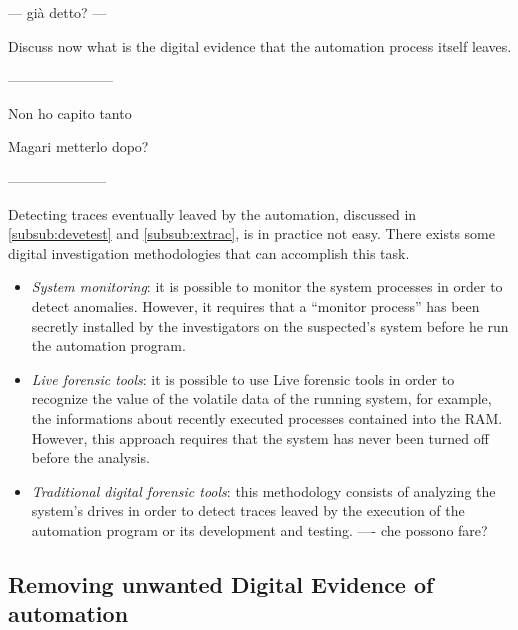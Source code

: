 \documentclass[runningheads,english]{llncs}
\begin{document}
{--- gi\`a detto? ---

Discuss now what is the digital evidence that the automation process itself
leaves.

-----------------------

Non ho capito tanto

Magari metterlo dopo?

---------------------




Detecting traces eventually leaved by the automation, discussed in \ref{subsub:devetest} and \ref{subsub:extrac}, is in practice not easy. There exists some digital investigation methodologies that can accomplish this task.

\begin{itemize}
 \item \emph{System monitoring}: it is possible to monitor the system processes in order to detect anomalies. However, it requires that a ``monitor process'' has been secretly installed by the investigators on the suspected's system before he run the automation program.
 \item \emph{Live forensic tools}: it is possible to use Live forensic tools in order to recognize the value of the volatile data of the running system, for example, the informations about recently executed processes contained into the RAM. However, this approach requires that the system has never been turned off before the analysis.
 \item \emph{Traditional digital forensic tools}: this methodology consists of analyzing the system's drives in order to detect traces leaved by the execution of the automation program or its development and testing.  
 ---- che possono fare?
\end{itemize}


\subsection{Removing unwanted Digital Evidence of automation}


}
\end{document}
